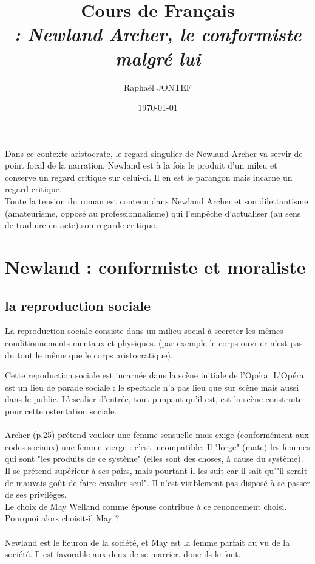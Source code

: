 \documentclass[a4paper,12pt]{article}
\title{Cours de Français\\ \Large \textit{\lti : Newland Archer, le conformiste malgré lui}}
\author{Raphaël JONTEF}
\date{\today}
\begin{document}
\maketitle

Dans ce contexte aristocrate, le regard singulier de Newland Archer va servir de point focal de la narration. Newland est à la fois le produit d'un mileu et conserve un regard critique sur celui-ci. Il en est le parangon mais incarne un regard critique.\\
Toute la tension du roman est contenu dans Newland Archer et son dilettantisme (amateurisme, opposé au professionnalisme) qui l'empêche d'actualiser (au sens de traduire en acte) son regarde critique.

\section{Newland : conformiste et moraliste}

\subsection{la reproduction sociale}

La reproduction sociale consiste dans un milieu social à secreter les mêmes conditionnements mentaux et physiques. (par exemple le corps ouvrier n'est pas du tout le même que le corps aristocratique).

Cette repoduction sociale est incarnée dans la scène initiale de l'Opéra. L'Opéra est un lieu de parade sociale : le spectacle n'a pas lieu que sur scène mais aussi dans le public. L'escalier d'entrée, tout pimpant qu'il est, est la scène construite pour cette ostentation sociale.\\\\

Archer (p.25) prétend vouloir une femme sensuelle mais exige (conformément aux codes sociaux) une femme vierge : c'est incompatible. Il "lorge" (mate) les femmes qui sont "les produits de ce système" (elles sont des choses, à cause du système). Il se prétend supérieur à ses pairs, mais pourtant il les suit car il sait qu'"il serait de mauvais goût de faire cavalier seul". Il n'est visiblement pas disposé à se passer de ses privilèges.\\
Le choix de May Welland comme épouse contribue à ce renoncement choisi. Pourquoi alors choisit-il May ?\\\\

Newland est le fleuron de la société, et May est la femme parfait au vu de la société. Il est favorable aux deux de se marrier, donc ils le font.
\end{document}
